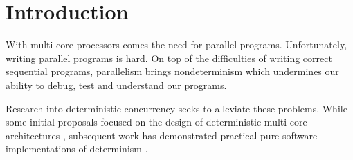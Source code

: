 \section{Introduction}

With multi-core processors comes the need for parallel programs. 
Unfortunately, writing parallel programs is hard. 
On top of the difficulties of writing correct sequential programs, parallelism brings nondeterminism which undermines our ability to debug, test and understand our programs.

Research into deterministic concurrency seeks to alleviate these problems. %
While some initial proposals focused on the design of deterministic multi-core architectures \cite{devietti_dmp:_2009,devietti_rcdc:_2011,derek_r._hower_calvin:_2011}, subsequent work has demonstrated practical pure-software implementations of determinism  \cite{liu_dthreads:_2011,merrifield_conversion:_2013,kai_lu_efficient_2014}.

